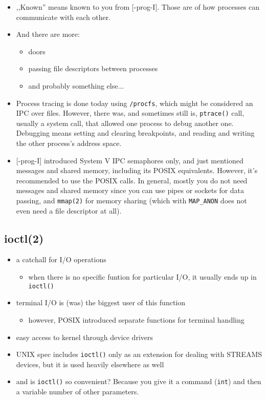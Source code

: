 \begin{itemize}
\item ,,Known'' means known to you from [\myun\myix-prog-I]. Those are  of how processes can communicate with each other.
\item And there are more:
	\begin{itemize}
	\item doors
	\item passing file descriptors between processes
	\item and probably something else...
	\end{itemize}
\item Process tracing is done today using \texttt{/procfs}, which might be
considered an IPC over files. However, there was, and sometimes still is,
\texttt{ptrace()} call, usually a system call, that allowed one process to debug
another one. Debugging means setting and clearing breakpoints, and reading and
writing the other process's address space.
\item {} [\myun\myix-prog-I] introduced System V IPC semaphores only, and just
mentioned messages and shared memory, including its POSIX equivalents. However,
it's recommended to use the POSIX calls. In general, mostly you do not need
messages and shared memory since you can use pipes or sockets for data passing,
and \texttt{mmap(2)} for memory sharing (which with \texttt{MAP\_ANON} does not
even need a file descriptor at all).
\end{itemize}

\subsection{ioctl(2)}

\begin{itemize}
\item a catchall for I/O operations
	\begin{itemize}
	\item when there is no specific funtion for particular I/O, it usually ends
	  up in \texttt{ioctl()}
	\end{itemize}
\item terminal I/O is (was) the biggest user of this function
	\begin{itemize}
	\item however, POSIX introduced separate functions for terminal handling
	\end{itemize}
\item easy access to kernel through device drivers
\item UNIX spec includes \texttt{ioctl()} only as an extension for
dealing with STREAMS devices, but it is used heavily elsewhere as well
\item and  is \texttt{ioctl()} so convenient? Because you give it a
command (\texttt{int}) and then a variable number of other parameters.
\end{itemize}

